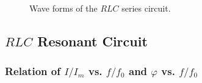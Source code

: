 \documentclass{article}
\begin{document}
\begin{figure}[H]
%
\caption{Wave forms of the $RLC$ series circuit. }\label{RLCwave}
\end{figure}


\subsection{$RLC$ Resonant Circuit}

\subsubsection{Relation of $I/I_m$ vs. $f/f_0$ and $\varphi$ vs. $f/f_0$}
\end{document}
